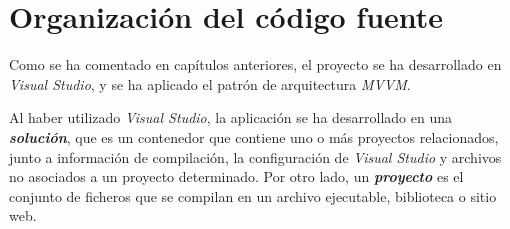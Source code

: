 
\section{Organización del código fuente}
Como se ha comentado en capítulos anteriores, el proyecto se ha desarrollado en \textit{Visual Studio}, y se ha aplicado el 
patrón de arquitectura \textit{MVVM}. \medskip

Al haber utilizado \textit{Visual Studio}, la aplicación se ha desarrollado en una \textbf{\textit{solución}}, que es un contenedor que contiene 
uno o más proyectos relacionados, junto a información de compilación, la configuración de \textit{Visual Studio} y archivos no asociados 
a un proyecto determinado. Por otro lado, un \textbf{\textit{proyecto}} es el conjunto de ficheros que se compilan en un archivo ejecutable, 
biblioteca o sitio web. \medskip

